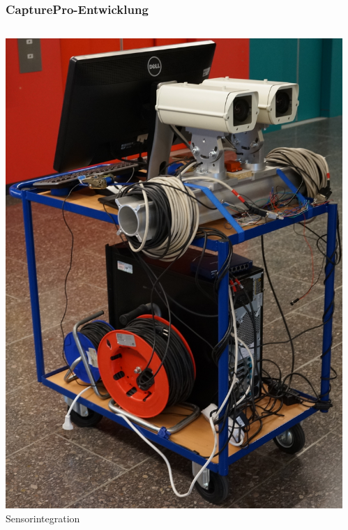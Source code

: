 \documentclass[aspectratio=169]{beamer}
\begin{document}
\begin{frame}
\frametitle{CapturePro-Entwicklung}
  \begin{columns}[onlytextwidth]
    \begin{column}{0.33\textwidth}
      \includegraphics[height=0.7\textheight]{./Abbildungen/cappro_1.JPG}
      \\
      Sensorintegration
    \end{column}
    \begin{column}{0.33\textwidth}

\end{column}
\end{columns}
\end{frame}
\end{document}
